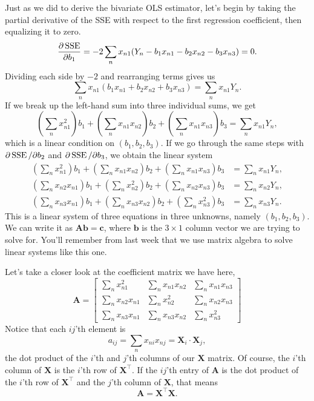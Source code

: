 \documentclass[
  12pt,
  oneside,openany]{book}
\begin{document}
Just as we did to derive the bivariate OLS estimator, let's begin by taking the partial derivative of the SSE with respect to the first regression coefficient, then equalizing it to zero.
\[
\frac{\partial \mathop{\rm SSE}\nolimits}{\partial b_1}
= -2 \sum_n x_{n1} (Y_n - b_1 x_{n1} - b_2 x_{n2} - b_3 x_{n3})
= 0.
\]
Dividing each side by \(-2\) and rearranging terms gives us
\[
\sum_n x_{n1} (b_1 x_{n1} + b_2 x_{n2} + b_3 x_{n3}) = \sum_n x_{n1} Y_n.
\]
If we break up the left-hand sum into three individual sums, we get
\[
\left( \sum_n x_{n1}^2 \right) b_1 + \left( \sum_n x_{n1} x_{n2} \right) b_2 + \left( \sum_n x_{n1} x_{n3} \right) b_3 = \sum_n x_{n1} Y_n,
\]
which is a linear condition on \((b_1, b_2, b_3)\). If we go through the same steps with \(\partial \mathop{\rm SSE}\nolimits/ \partial b_2\) and \(\partial \mathop{\rm SSE}\nolimits/ \partial b_3\), we obtain the linear system
\[
\begin{aligned}
\left( \sum_n x_{n1}^2 \right) b_1 + \left( \sum_n x_{n1} x_{n2} \right) b_2 + \left( \sum_n x_{n1} x_{n3} \right) b_3 &= \sum_n x_{n1} Y_n, \\
\left( \sum_n x_{n2} x_{n1} \right) b_1 + \left( \sum_n x_{n2}^2 \right) b_2 + \left( \sum_n x_{n2} x_{n3} \right) b_3 &= \sum_n x_{n2} Y_n, \\
\left( \sum_n x_{n3} x_{n1} \right) b_1 + \left( \sum_n x_{n3} x_{n2} \right) b_2 + \left( \sum_n x_{n3}^2 \right) b_3 &= \sum_n x_{n3} Y_n.
\end{aligned}
\]
This is a linear system of three equations in three unknowns, namely \((b_1, b_2, b_3)\). We can write it as \(\mathbf{A} \mathbf{b} = \mathbf{c}\), where \(\mathbf{b}\) is the \(3 \times 1\) column vector we are trying to solve for. You'll remember from last week that we use matrix algebra to solve linear systems like this one.

Let's take a closer look at the coefficient matrix we have here,
\[
\mathbf{A} =
\begin{bmatrix}
\sum_n x_{n1}^2 & \sum_n x_{n1} x_{n2} & \sum_n x_{n1} x_{n3} \\
\sum_n x_{n2} x_{n1} & \sum_n x_{n2}^2 & \sum_n x_{n2} x_{n3} \\
\sum_n x_{n3} x_{n1} & \sum_n x_{n3} x_{n2} & \sum_n x_{n3}^2
\end{bmatrix}
\]
Notice that each \(ij\)'th element is
\[
a_{ij} = \sum_n x_{ni} x_{nj} = \mathbf{X}_i \cdot \mathbf{X}_j,
\]
the dot product of the \(i\)'th and \(j\)'th columns of our \(\mathbf{X}\) matrix. Of course, the \(i\)'th column of \(\mathbf{X}\) is the \(i\)'th row of \(\mathbf{X}^\top\). If the \(ij\)'th entry of \(\mathbf{A}\) is the dot product of the \(i\)'th row of \(\mathbf{X}^\top\) and the \(j\)'th column of \(\mathbf{X}\), that means
\[
\mathbf{A} = \mathbf{X}^\top \mathbf{X}.
\]
\end{document}
